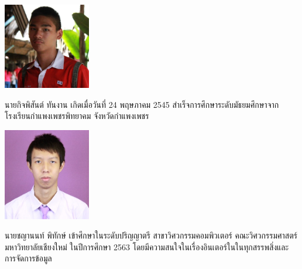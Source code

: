 \documentclass[final]{cpecmu}
\author{นายกิจพิสันต์ ทันงาน}{Chayanon Pitak}{630610716}
\author{นายชญานนท์ พิทักษ์}{Kitpisan Tanngan}{630610724}
\begin{document}


\pagestyle{empty}\cleardoublepage
\normalspacing \setcounter{page}{1}  \pagestyle{cpecmu}





\ifproject

\fi



\ifproject
\normalspacing
\appendix


\ifglossary\glossarypage\fi

\ifindex\indexpage\fi

\begin{biosketch}
\begin{center}
  \includegraphics[width=1.5in]{Kitpisan.jpg}
\end{center}
  นายกิจพิสันต์ ทันงาน เกิดเมื่อวันที่ 24 พฤษภาคม 2545 สำเร็จการศึกษาระดับมัธยมศึกษาจาก
โรงเรียนกำแพงเพชรพิทยาคม จังหวัดกำแพงเพชร
\begin{center}
  \includegraphics[width=1.5in]{chayanon.png}
\end{center}
  นายชญานนท์ พิทักษ์ เข้าศึกษาในระดับปริญญาตรี สาขาวิศวกรรมคอมพิวเตอร์ คณะวิศวกรรมศาสตร์ มหาวิทยาลัยเชียงใหม่ ในปีการศึกษา 2563 โดยมีความสนใจในเรื่องอินเตอร์ในในทุกสรรพสิ่งและการจัดการข้อมูล
\end{biosketch}
\fi %
\end{document}
